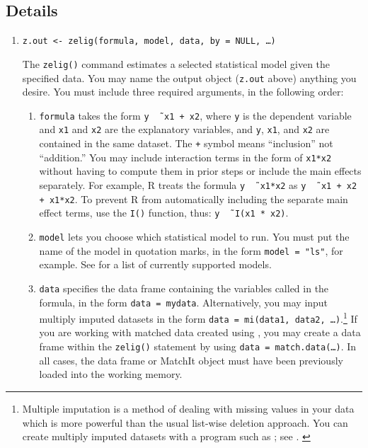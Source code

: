 \subsection{Details}

\begin{enumerate}
\item {\tt z.out <- zelig(formula, model, data, by = NULL, \dots)}
 
  The {\tt zelig()} command estimates a selected statistical model
  given the specified data.  You may name the output object
  (\texttt{z.out} above) anything you desire.  You must include three
  required arguments, in the following order:

  \begin{enumerate}

  \item \texttt{formula} takes the form {\tt y \~\, x1 + x2}, where
    {\tt y} is the dependent variable and {\tt x1} and {\tt x2} are
    the explanatory variables, and {\tt y}, {\tt x1}, and {\tt x2} are
    contained in the same dataset.  The {\tt +} symbol means
    ``inclusion'' not ``addition.''  You may include interaction terms
    in the form of {\tt x1*x2} without having to compute them in prior
    steps or include the main effects separately.  For example, R
    treats the formula {\tt y \~\, x1*x2} as {\tt y \~\, x1 + x2 +
      x1*x2}.  To prevent R from automatically including the separate
    main effect terms, use the {\tt I()} function, thus: {\tt y \~\,
      I(x1 * x2)}.

  \item \texttt{model} lets you choose which statistical model to run.
    You must put the name of the model in quotation marks, in the form
    {\tt model = "ls"}, for example.  See  for a list
    of currently supported models.

  \item \texttt{data} specifies the data frame containing the
    variables called in the formula, in the form {\tt data = mydata}.
    Alternatively, you may input multiply imputed datasets in the form
    {\tt data = mi(data1, data2, \dots)}.\footnote{Multiple
      imputation is a method of dealing with missing values in your
      data which is more powerful than the usual list-wise deletion
      approach.  You can create multiply imputed datasets with a
      program such as
      ;
      see .
    \label{mi}}  If you are working with matched data created using
  , you may create a
  data frame within the {\tt zelig()} statement by using {\tt data =
    match.data(\dots)}.  In all cases, the data frame or MatchIt
  object must have been previously loaded into the working memory.
  

\end{enumerate}
\end{enumerate}
